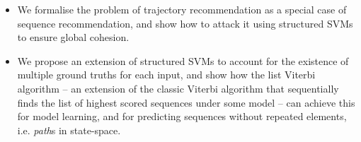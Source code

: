 \begin{itemize}[noitemsep,leftmargin=12pt]%
    \item We formalise the problem of trajectory recommendation as a special case of sequence recommendation,
          and show how to attack it using structured SVMs to ensure global cohesion.

    

    \item We propose an extension of structured SVMs to account for the existence of multiple ground truths for each input,
          and show how the list Viterbi algorithm -- an extension of the classic Viterbi algorithm that sequentially finds the list of highest scored sequences under some model -- can achieve this for model learning,
and for predicting sequences without repeated elements, i.e. {\em path}s in state-space.



\end{itemize}
